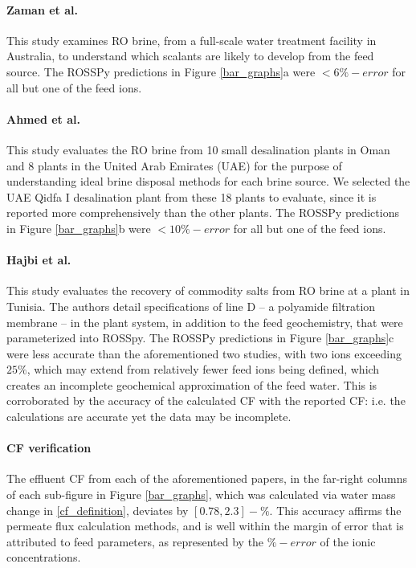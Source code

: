 \paragraph{Zaman et al.\cite{Zaman2015DownstreamCompounds}}
This study  examines RO brine, from a full-scale water treatment facility in Australia, to understand which scalants are likely to develop from the feed source. The ROSSPy predictions in Figure \ref{bar_graphs}a were $<6\%-error$ for all but one of the feed ions.

\paragraph{Ahmed et al.\cite{Ahmed2001BrineEmirates}}
This study  evaluates the RO brine from 10 small desalination plants in Oman and 8 plants in the United Arab Emirates (UAE) for the purpose of understanding ideal brine disposal methods for each brine source. We selected the UAE Qidfa I desalination plant from these 18 plants to evaluate, since it is reported more comprehensively than the other plants. The ROSSPy predictions in Figure \ref{bar_graphs}b were $<10\%-error$ for all but one of the feed ions.

\paragraph{Hajbi et al.\cite{Hajbi2010ReuseBrine}}
This study  evaluates the recovery of commodity salts from RO brine at a plant in Tunisia. The authors detail specifications of line D -- a polyamide filtration membrane -- in the plant system, in addition to the feed geochemistry, that were parameterized into ROSSpy.  The ROSSPy predictions in Figure \ref{bar_graphs}c were less accurate than the aforementioned two studies, with two ions exceeding $25\%$, which may extend from relatively fewer feed ions being defined, which creates an incomplete geochemical approximation of the feed water. This is corroborated by the accuracy of the calculated CF with the reported CF: i.e. the calculations are accurate yet the data may be incomplete.

\paragraph{CF verification}
The effluent CF from each of the aforementioned papers, in the far-right columns of each sub-figure in Figure \ref{bar_graphs}, which was calculated via water mass change in \cref{cf_definition}, deviates by $[0.78, 2.3]-\%$. This accuracy affirms the permeate flux calculation methods, and is well within the margin of error that is attributed to feed parameters, as represented by the $\%-error$ of the ionic concentrations.

